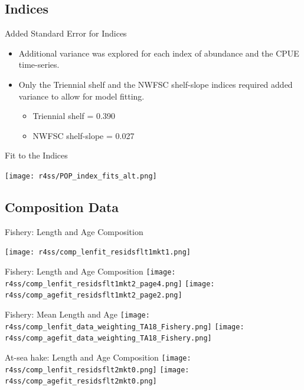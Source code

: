 \documentclass[pdf]{beamer}\usepackage[]{graphicx}\usepackage[]{color}
\begin{document}
\subsection{Indices}
\begin{frame}{Added Standard Error for Indices}
  \begin{itemize}
    \item Additional variance was explored for each index of abundance and the CPUE time-series.
    \item Only the Triennial shelf and the NWFSC shelf-slope indices required added variance to allow for model fitting.
      \begin{itemize}
        \item Triennial shelf = 0.390
        \item NWFSC shelf-slope = 0.027 
      \end{itemize}
  \end{itemize}
\end{frame}


\begin{frame}{Fit to the Indices}
  \begin{center}
    \texttt{[image: r4ss/POP\_index\_fits\_alt.png]}
  \end{center}
\end{frame}


\subsection{Composition Data}
\begin{frame}{Fishery: Length and Age Composition}
  \begin{center}
  \texttt{[image: r4ss/comp\_lenfit\_residsflt1mkt1.png]}
  \end{center}
\end{frame}

\begin{frame}{Fishery: Length and Age Composition}
  \texttt{[image: r4ss/comp\_lenfit\_residsflt1mkt2\_page4.png]}
  \texttt{[image: r4ss/comp\_agefit\_residsflt1mkt2\_page2.png]}
\end{frame}

\begin{frame}{Fishery: Mean Length and Age}
  \texttt{[image: r4ss/comp\_lenfit\_data\_weighting\_TA18\_Fishery.png]}
  \texttt{[image: r4ss/comp\_agefit\_data\_weighting\_TA18\_Fishery.png]}
\end{frame}

\begin{frame}{At-sea hake: Length and Age Composition}
  \texttt{[image: r4ss/comp\_lenfit\_residsflt2mkt0.png]}
  \texttt{[image: r4ss/comp\_agefit\_residsflt2mkt0.png]}
\end{frame}
\end{document}
